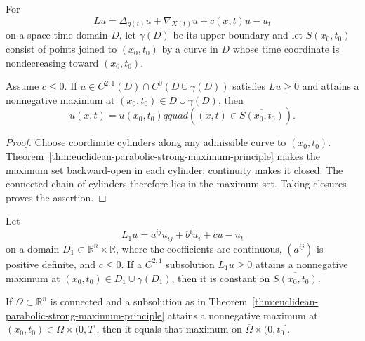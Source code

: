 For
\[
Lu=\Delta_{g(t)}u+\nabla_{X(t)}u+c(x,t)u-u_t
\]
on a space-time domain $D$, let $\gamma(D)$ be its upper boundary and let
$S(x_0,t_0)$ consist of points joined to $(x_0,t_0)$ by a curve in $D$ whose
time coordinate is nondecreasing toward $(x_0,t_0)$.

\begin{theorem}
\label{thm:manifold-parabolic-strong-maximum-principle}
Assume $c\leq0$.  If $u\in C^{2,1}(D)\cap C^0(D\cup\gamma(D))$ satisfies
$Lu\geq0$ and attains a nonnegative maximum at
$(x_0,t_0)\in D\cup\gamma(D)$, then
\[
u(x,t)=u(x_0,t_0)qquad ((x,t)\in\overline{S(x_0,t_0)}).
\]
\end{theorem}

\begin{proof}
\sketch
{}
Choose coordinate cylinders along any admissible curve to $(x_0,t_0)$.
Theorem~\ref{thm:euclidean-parabolic-strong-maximum-principle} makes the
maximum set backward-open in each cylinder; continuity makes it closed.
The connected chain of cylinders therefore lies in the maximum set.  Taking
closures proves the assertion.
\end{proof}

\begin{theorem}
\label{thm:euclidean-parabolic-strong-maximum-principle}
Let
\[
L_1u=a^{ij}u_{ij}+b^iu_i+cu-u_t
\]
on a domain $D_1\subset\mathbb R^n\times\mathbb R$, where the coefficients
are continuous, $(a^{ij})$ is positive definite, and $c\leq0$.  If a
$C^{2,1}$ subsolution $L_1u\geq0$ attains a nonnegative maximum at
$(x_0,t_0)\in D_1\cup\gamma(D_1)$, then it is constant on
$\overline{S(x_0,t_0)}$.
\end{theorem}

\begin{corollary}
\label{cor:cylindrical-parabolic-strong-maximum-principle}
If $\Omega\subset\mathbb R^n$ is connected and a subsolution as in
Theorem~\ref{thm:euclidean-parabolic-strong-maximum-principle} attains a
nonnegative maximum at $(x_0,t_0)\in\Omega\times(0,T]$, then it equals that
maximum on $\overline\Omega\times(0,t_0]$.
\end{corollary}

